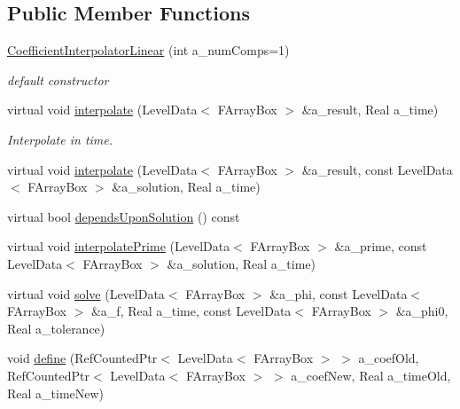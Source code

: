 \subsection*{Public Member Functions}
\begin{DoxyCompactItemize}
\item 
\hypertarget{class_coefficient_interpolator_linear_a99f4253fee5e273890ca1dbf9f9ff60e}{\hyperlink{class_coefficient_interpolator_linear_a99f4253fee5e273890ca1dbf9f9ff60e}{Coefficient\-Interpolator\-Linear} (int a\-\_\-num\-Comps=1)}\label{class_coefficient_interpolator_linear_a99f4253fee5e273890ca1dbf9f9ff60e}

\begin{DoxyCompactList}\small\item\em default constructor \end{DoxyCompactList}\item 
\hypertarget{class_coefficient_interpolator_linear_ae9e668747f2c5a702d022c26d27ceb3a}{virtual void \hyperlink{class_coefficient_interpolator_linear_ae9e668747f2c5a702d022c26d27ceb3a}{interpolate} (Level\-Data$<$ F\-Array\-Box $>$ \&a\-\_\-result, Real a\-\_\-time)}\label{class_coefficient_interpolator_linear_ae9e668747f2c5a702d022c26d27ceb3a}

\begin{DoxyCompactList}\small\item\em Interpolate in time. \end{DoxyCompactList}\item 
virtual void \hyperlink{class_coefficient_interpolator_linear_a7558771f5d460bb587cc8f90c0156b1f}{interpolate} (Level\-Data$<$ F\-Array\-Box $>$ \&a\-\_\-result, const Level\-Data$<$ F\-Array\-Box $>$ \&a\-\_\-solution, Real a\-\_\-time)
\item 
virtual bool \hyperlink{class_coefficient_interpolator_linear_a498be7688cfdc0831606822cfde2de24}{depends\-Upon\-Solution} () const 
\item 
virtual void \hyperlink{class_coefficient_interpolator_linear_a86904e8968464cbeaf2c5dbae76f7545}{interpolate\-Prime} (Level\-Data$<$ F\-Array\-Box $>$ \&a\-\_\-prime, const Level\-Data$<$ F\-Array\-Box $>$ \&a\-\_\-solution, Real a\-\_\-time)
\item 
virtual void \hyperlink{class_coefficient_interpolator_linear_ab1c2295a8ed1749ad55dd366bde4139a}{solve} (Level\-Data$<$ F\-Array\-Box $>$ \&a\-\_\-phi, const Level\-Data$<$ F\-Array\-Box $>$ \&a\-\_\-f, Real a\-\_\-time, const Level\-Data$<$ F\-Array\-Box $>$ \&a\-\_\-phi0, Real a\-\_\-tolerance)
\item 
\hypertarget{class_coefficient_interpolator_linear_af6983e0b6efb89666c6e163db00aa79c}{void \hyperlink{class_coefficient_interpolator_linear_af6983e0b6efb89666c6e163db00aa79c}{define} (Ref\-Counted\-Ptr$<$ Level\-Data$<$ F\-Array\-Box $>$ $>$ a\-\_\-coef\-Old, Ref\-Counted\-Ptr$<$ Level\-Data$<$ F\-Array\-Box $>$ $>$ a\-\_\-coef\-New, Real a\-\_\-time\-Old, Real a\-\_\-time\-New)}\label{class_coefficient_interpolator_linear_af6983e0b6efb89666c6e163db00aa79c}


\end{DoxyCompactItemize}
